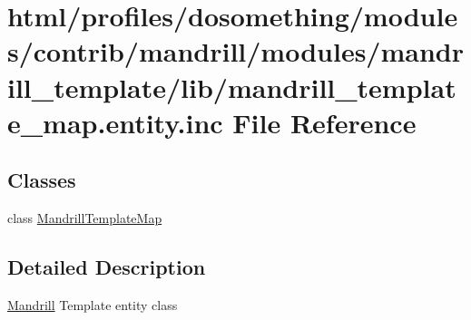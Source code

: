 \hypertarget{mandrill__template__map_8entity_8inc}{
\section{html/profiles/dosomething/modules/contrib/mandrill/modules/mandrill\_\-template/lib/mandrill\_\-template\_\-map.entity.inc File Reference}
\label{mandrill__template__map_8entity_8inc}
}
\subsection*{Classes}
\begin{DoxyCompactItemize}
\item 
class \hyperlink{classMandrillTemplateMap}{MandrillTemplateMap}
\end{DoxyCompactItemize}


\subsection{Detailed Description}
\hyperlink{classMandrill}{Mandrill} Template entity class 